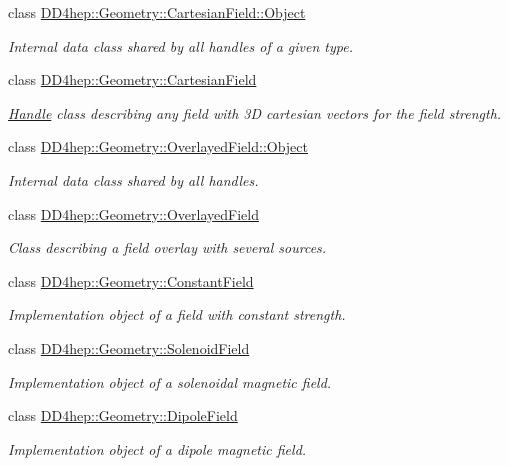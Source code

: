 \begin{DoxyCompactItemize}
class \hyperlink{class_d_d4hep_1_1_geometry_1_1_cartesian_field_1_1_object}{D\+D4hep\+::\+Geometry\+::\+Cartesian\+Field\+::\+Object}
\begin{DoxyCompactList}\small\item\em Internal data class shared by all handles of a given type. \end{DoxyCompactList}\item 
class \hyperlink{class_d_d4hep_1_1_geometry_1_1_cartesian_field}{D\+D4hep\+::\+Geometry\+::\+Cartesian\+Field}
\begin{DoxyCompactList}\small\item\em \hyperlink{class_d_d4hep_1_1_handle}{Handle} class describing any field with 3D cartesian vectors for the field strength. \end{DoxyCompactList}\item 
class \hyperlink{class_d_d4hep_1_1_geometry_1_1_overlayed_field_1_1_object}{D\+D4hep\+::\+Geometry\+::\+Overlayed\+Field\+::\+Object}
\begin{DoxyCompactList}\small\item\em Internal data class shared by all handles. \end{DoxyCompactList}\item 
class \hyperlink{class_d_d4hep_1_1_geometry_1_1_overlayed_field}{D\+D4hep\+::\+Geometry\+::\+Overlayed\+Field}
\begin{DoxyCompactList}\small\item\em Class describing a field overlay with several sources. \end{DoxyCompactList}\item 
class \hyperlink{class_d_d4hep_1_1_geometry_1_1_constant_field}{D\+D4hep\+::\+Geometry\+::\+Constant\+Field}
\begin{DoxyCompactList}\small\item\em Implementation object of a field with constant strength. \end{DoxyCompactList}\item 
class \hyperlink{class_d_d4hep_1_1_geometry_1_1_solenoid_field}{D\+D4hep\+::\+Geometry\+::\+Solenoid\+Field}
\begin{DoxyCompactList}\small\item\em Implementation object of a solenoidal magnetic field. \end{DoxyCompactList}\item 
class \hyperlink{class_d_d4hep_1_1_geometry_1_1_dipole_field}{D\+D4hep\+::\+Geometry\+::\+Dipole\+Field}
\begin{DoxyCompactList}\small\item\em Implementation object of a dipole magnetic field. \end{DoxyCompactList}\item 

\end{DoxyCompactItemize}
